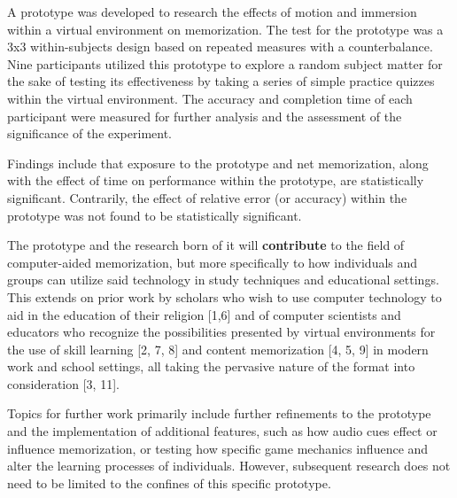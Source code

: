 \documentclass{vgtc}                          %
\begin{document}
A prototype was developed to research the effects of motion and immersion within a virtual environment on memorization. The test for the prototype was a 3x3 within-subjects design based on repeated measures with a counterbalance. Nine participants utilized this prototype to explore a random subject matter for the sake of testing its effectiveness by taking a series of simple practice quizzes within the virtual environment. The accuracy and completion time of each participant were measured for further analysis and the assessment of the significance of the experiment.

Findings include that exposure to the prototype and net memorization, along with the effect of time on performance within the prototype, are statistically significant. Contrarily, the effect of relative error (or accuracy) within the prototype was not found to be statistically significant.

The prototype and the research born of it will \textbf{contribute} to the field of computer-aided memorization, but more specifically to how individuals and groups can utilize said technology in study techniques and educational settings. This extends on prior work by scholars who wish to use computer technology to aid in the education of their religion [1,6] and of computer scientists and educators who recognize the possibilities presented by virtual environments for the use of skill learning [2, 7, 8] and content memorization [4, 5, 9] in modern work and school settings, all taking the pervasive nature of the format into consideration [3, 11].

Topics for further work primarily include further refinements to the prototype and the implementation of additional features, such as how audio cues effect or influence memorization, or testing how specific game mechanics influence and alter the learning processes of individuals. However, subsequent research does not need to be limited to the confines of this specific prototype.

%


\cite{src1} \cite{src2} \cite{src3} \cite{src4} \cite{src5}
\cite{src6} \cite{src7} \cite{src8} \cite{src9} \cite{src10}
\cite{quizlet}

\end{document}
